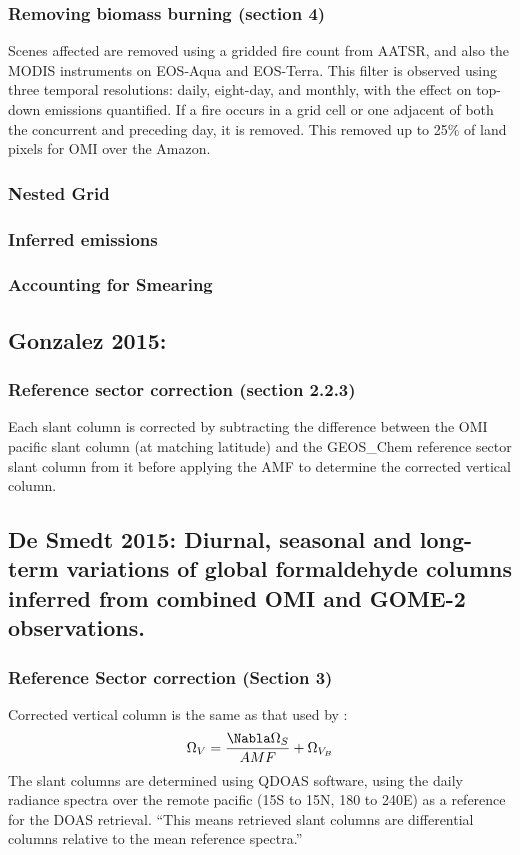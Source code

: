 \documentclass[11pt]{article} %
\begin{document}
    
    \subsubsection{Removing biomass burning (section 4)}
      Scenes affected are removed using a gridded fire count from AATSR, and also the MODIS instruments on EOS-Aqua and EOS-Terra.
      This filter is observed using three temporal resolutions: daily, eight-day, and monthly, with the effect on top-down emissions quantified.
      If a fire occurs in a grid cell or one adjacent of both the concurrent and preceding day, it is removed.
      This removed up to 25\% of land pixels for OMI over the Amazon.
    
    \subsubsection{Nested Grid}
    
    \subsubsection{Inferred emissions}
    
    \subsubsection{Accounting for Smearing}
      
  \subsection{Gonzalez 2015: }
    \citet{Gonzalez2015}
    \subsubsection{Reference sector correction (section 2.2.3)}
      Each slant column is corrected by subtracting the difference between the OMI pacific slant column (at matching latitude) and the GEOS_Chem reference sector slant column from it before applying the AMF to determine the corrected vertical column.
      
  
  \subsection{De Smedt 2015: Diurnal, seasonal and long-term variations of global formaldehyde columns inferred from combined OMI and GOME-2 observations.}
    \citet{DeSmedt2015}
    \subsubsection{Reference Sector correction (Section 3)}
      Corrected vertical column is the same as that used by \citet{Barkley2013}:
      \begin{equation*}
        \Omega_V = \frac{ \Nabla \Omega_{S} }{ AMF } + \Omega_{V_B}
      \end{equation*}
      The slant columns are determined using QDOAS software, using the daily radiance spectra over the remote pacific (15S to 15N, 180 to 240E) as a reference for the DOAS retrieval. 
      ``This means retrieved slant columns are differential columns relative to the mean reference spectra.''
      
\end{document}
